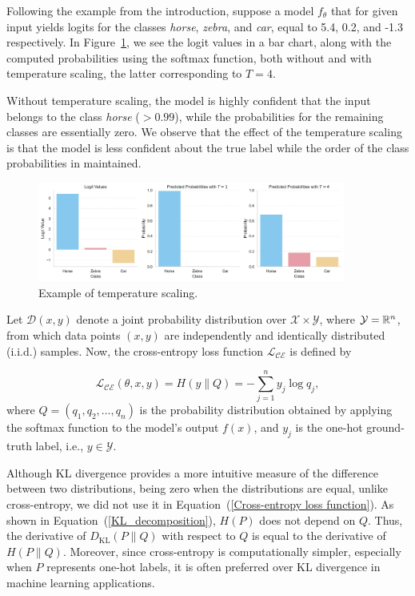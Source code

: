 \begin{example}
	Following the example from the introduction, suppose a model $f_\theta$ that for given input yields logits for the classes \textit{horse}, \textit{zebra}, and \textit{car}, equal to 5.4, 0.2, and -1.3 respectively. In Figure~\ref{fig:temperature_example}, we see the logit values in a bar chart, along with the computed probabilities using the softmax function, both without and with temperature scaling, the latter corresponding to $T=4$.
	
	Without temperature scaling, the model is highly confident that the input belongs to the class \textit{horse} ($>0.99$), while the probabilities for the remaining classes are essentially zero. We observe that the effect of the temperature scaling is that the model is less confident about the true label while the order of the class probabilities in maintained.
	
	\begin{figure}[h!]
		\centering
		\includegraphics[width=0.9\textwidth]{../img/temperature_example_plot.pdf}
		\caption{Example of temperature scaling.}
		\label{fig:temperature_example}
	\end{figure}
\end{example}

Let $\mathcal{D}(x,y)$ denote a joint probability distribution over $\mathcal{X} \times \mathcal{Y}$, where $\mathcal{Y} = \mathbb{R}^n$, from which data points $(x,y)$ are independently and identically distributed (i.i.d.) samples. Now, the cross-entropy loss function $\mathcal{L_{\text{CE}}}$ is defined by

\begin{equation}
	\mathcal{L_{\text{CE}}}(\theta,x,y) = H(y \| Q) = - \sum_{j=1}^{n} y_{j} \log q_j,
	\label{Cross-entropy loss function}
\end{equation}
where $Q = (q_1,q_2,\dots,q_n)$ is the probability distribution obtained by applying the softmax function to the model's output $f(x)$, and $y_j$ is the one-hot ground-truth label, i.e., $y \in \mathcal{Y}$.

Although KL divergence provides a more intuitive measure of the difference between two distributions, being zero when the distributions are equal, unlike cross-entropy, we did not use it in Equation~(\ref{Cross-entropy loss function}). As shown in Equation~(\ref{KL_decomposition}), $H(P)$ does not depend on $Q$. Thus, the derivative of $D_{\text{KL}}(P \| Q)$ with respect to $Q$ is equal to the derivative of $H(P \| Q)$. Moreover, since cross-entropy is computationally simpler, especially when $P$ represents one-hot labels, it is often preferred over KL divergence in machine learning applications.

